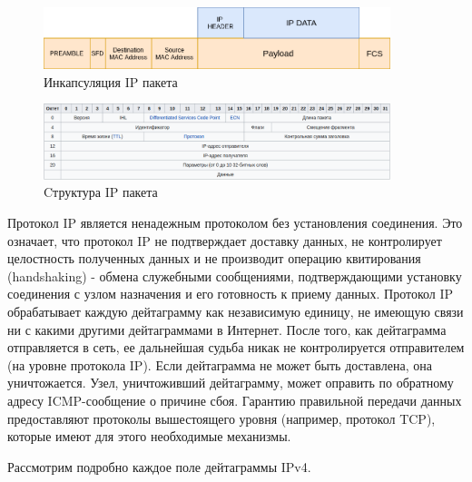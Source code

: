 \begin{figure}[h]
	\centering
	\includegraphics[width=0.9\textwidth]{image/IP}
	\caption{Инкапсуляция IP пакета}
	\label{INC_IP}
\end{figure}

\begin{figure}[h]
	\centering
	\includegraphics[width=0.9\textwidth]{image/IP-Protocol}
	\caption{Cтруктура IP пакета}
	\label{IP_protocol_paket}
\end{figure}

Протокол IP является ненадежным протоколом без установления соединения. Это означает, что протокол IP не подтверждает доставку данных, не контролирует целостность полученных данных и не производит операцию квитирования (handshaking) - обмена служебными сообщениями, подтверждающими установку соединения с узлом назначения и его готовность к приему данных. Протокол IP обрабатывает каждую дейтаграмму как независимую единицу, не имеющую связи ни с какими другими дейтаграммами в Интернет. После того, как дейтаграмма отправляется в сеть, ее дальнейшая судьба никак не контролируется отправителем (на уровне протокола IP). Если дейтаграмма не может быть доставлена, она уничтожается. Узел, уничтоживший дейтаграмму, может оправить по обратному адресу ICMP-сообщение о причине сбоя. Гарантию правильной передачи данных предоставляют протоколы вышестоящего уровня (например, протокол TCP), которые имеют для этого необходимые механизмы.

Рассмотрим подробно каждое поле дейтаграммы IPv4. 

